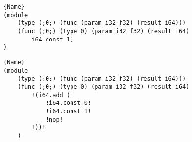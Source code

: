 \begin{minipage}{0.9\linewidth}


   \begin{minipage}[b]{\linewidth}
    \lstset{
        language=WAT,
                        style=watcode,
        basicstyle=\footnotesize\ttfamily,
                        columns=fullflexible,
                        breaklines=true}
        
        \begin{lstlisting}[label=example:peeporig,caption={Wasm function.},frame=b, captionpos=b]{Name}
(module
    (type (;0;) (func (param i32 f32) (result i64)))
    (func (;0;) (type 0) (param i32 f32) (result i64)
        i64.const 1)
)
        \end{lstlisting}
\end{minipage}


\begin{minipage}[b]{\linewidth}
    \lstset{
        language=WAT,
                        style=watcode,
        basicstyle=\footnotesize\ttfamily,
                        columns=fullflexible,
                        breaklines=true}
        
        \begin{lstlisting}[label=example:peepapplied,caption={Random peephole mutation using e-graph traversal for \autoref{example:peeporig} over e-graph \autoref{e-graph3}. The textual format is folded for better understanding.},frame=b, captionpos=b]{Name}
(module
    (type (;0;) (func (param i32 f32) (result i64)))
    (func (;0;) (type 0) (param i32 f32) (result i64)
        !(i64.add (!
            !i64.const 0!
            !i64.const 1!
            !nop!
        !))!
    )
        \end{lstlisting}
\end{minipage}

\end{minipage}
